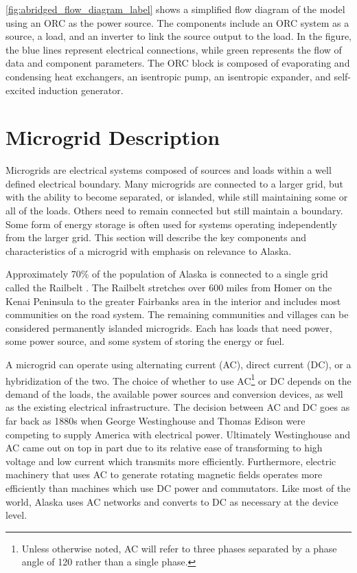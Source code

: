 \autoref{fig:abridged_flow_diagram_label} shows a simplified flow diagram of the model using an ORC as the power source. The components include an ORC system as a source, a load, and an inverter to link the source output to the load. In the figure, the blue lines represent electrical connections, while green represents the flow of data and component parameters. The ORC block is composed of evaporating and condensing heat exchangers, an isentropic pump, an isentropic expander, and self-excited induction generator. 


\section{Microgrid Description}
Microgrids are electrical systems composed of sources and loads within a well defined electrical boundary. Many microgrids are connected to a larger grid, but with the ability to become separated, or islanded, while still maintaining some or all of the loads. Others need to remain connected but still maintain a boundary. Some form of energy storage is often used for systems operating independently from the larger grid. This section will describe the key components and characteristics of a microgrid with emphasis on relevance to Alaska.

Approximately 70\% of the population of Alaska is connected to a single grid called the Railbelt \cite{railbelt}. The Railbelt stretches over 600 miles from Homer on the Kenai Peninsula to the greater Fairbanks area in the interior and includes most communities on the road system. The remaining communities and villages can be considered permanently islanded microgrids. Each has loads that need power, some power source, and some system of storing the energy or fuel.

A microgrid can operate using alternating current (AC), direct current (DC), or a hybridization of the two. The choice of whether to use AC\footnote{Unless otherwise noted, AC will refer to three phases separated by a phase angle of 120\textdegree{} rather than a single phase.} or DC depends on the demand of the loads, the available power sources and conversion devices, as well as the existing electrical infrastructure. The decision between AC and DC goes as far back as 1880s when George Westinghouse and Thomas Edison were competing to supply America with electrical power. Ultimately Westinghouse and AC came out on top in part due to its relative ease of transforming to high voltage and low current which transmits more efficiently. Furthermore, electric machinery that uses AC to generate rotating magnetic fields operates more efficiently than machines which use DC power and commutators. Like most of the world, Alaska uses AC networks and converts to DC as necessary at the device level.

